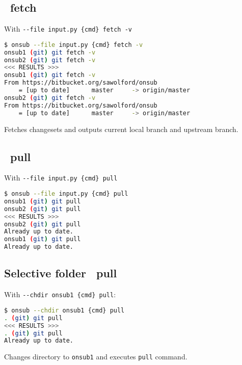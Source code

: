 \subsection{\Git\ fetch}

With \lstinline|--file input.py {cmd} fetch -v|

\begin{snugshade}
\begin{lstlisting}[language=bash]	
$ onsub --file input.py {cmd} fetch -v
onsub1 (git) git fetch -v
onsub2 (git) git fetch -v
<<< RESULTS >>>
onsub1 (git) git fetch -v
From https://bitbucket.org/sawolford/onsub
	= [up to date]      master     -> origin/master
onsub2 (git) git fetch -v
From https://bitbucket.org/sawolford/onsub
	= [up to date]      master     -> origin/master
\end{lstlisting}
\end{snugshade}

Fetches changesets and outputs current local branch and upstream branch.

\subsection{\Git\ pull}

With \lstinline|--file input.py {cmd} pull|

\begin{snugshade}
\begin{lstlisting}[language=bash]	
$ onsub --file input.py {cmd} pull
onsub1 (git) git pull
onsub2 (git) git pull
<<< RESULTS >>>
onsub2 (git) git pull
Already up to date.
onsub1 (git) git pull
Already up to date.
\end{lstlisting}
\end{snugshade}

\subsection{Selective folder \Git\ pull}

With \lstinline|--chdir onsub1 {cmd} pull|:

\begin{snugshade}
\begin{lstlisting}[language=bash]	
$ onsub --chdir onsub1 {cmd} pull
. (git) git pull
<<< RESULTS >>>
. (git) git pull
Already up to date.
\end{lstlisting}
\end{snugshade}

Changes directory to \lstinline{onsub1} and executes \lstinline{pull} command.

